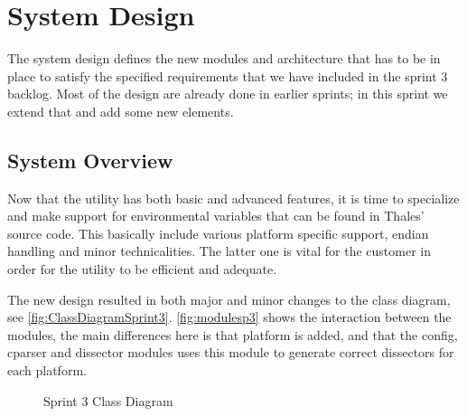 \section{System Design}
\label{sec:sp3:design}
The system design defines the new modules and architecture that has to be in place to satisfy the specified requirements that we have included in the sprint 3 backlog. Most of the design are already done in earlier sprints; in this sprint we extend that and add some new elements.

\subsection{System Overview}
Now that the \gls{utility} has both basic and advanced features, it is time to specialize and make support for environmental variables that can be found in Thales' source code. This basically include various platform specific support, \gls{endian} handling and minor technicalities. The latter one is vital for the customer in order for the \gls{utility} to be efficient and adequate.

The new design resulted in both major and minor changes to the class diagram, see \autoref{fig:ClassDiagramSprint3}. \autoref{fig:modulesp3} shows the interaction between the modules, the main differences here is that platform is added, and that the config, cparser and dissector modules uses this module to generate correct dissectors for each platform.

\begin{figure}[htbp]
	\noindent{}
	\caption{Sprint 3 Class Diagram\label{fig:ClassDiagramSprint3}}
\end{figure}

